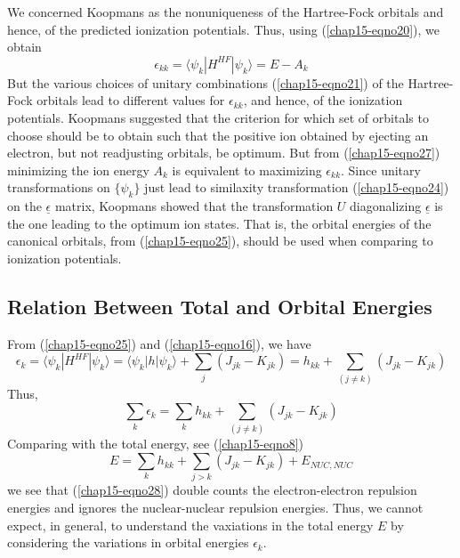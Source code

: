 We concerned Koopmans as the nonuniqueness of the Hartree-Fock
orbitals and hence, of the predicted ionization potentials. Thus,
using (\ref{chap15-eqno20}), we obtain
\begin{equation}
\epsilon_{kk} = \langle \psi_k \left| H^{HF} \right| \psi_k \rangle = E - 
A_k
\label{chap15-eqno27}
\end{equation}
But the various choices of unitary combinations (\ref{chap15-eqno21})
of the Hartree-Fock orbitals lead to different values for
$\epsilon_{kk}$, and hence, of the ionization potentials.  Koopmans
suggested that the criterion for which set of orbitals to choose
should be to obtain such that the positive ion obtained by ejecting an
electron, but not readjusting orbitals, be optimum. But from
(\ref{chap15-eqno27}) minimizing the ion energy $A_k$ is equivalent to
maximizing $\epsilon_{kk}$.  Since unitary transformations on
$\{\psi_k\}$ just lead to similaxity transformation
(\ref{chap15-eqno24}) on the $\underline{\epsilon}$ matrix, Koopmans
showed that the transformation $U$ diagonalizing
$\underline{\epsilon}$ is the one leading to the optimum ion states.
That is, the orbital energies of the canonical orbitals, from
(\ref{chap15-eqno25}), should be used when comparing to ionization
potentials.

\subsection{Relation Between Total and Orbital Energies}

From (\ref{chap15-eqno25}) and (\ref{chap15-eqno16}), we have
\begin{equation}
\epsilon_k = \langle \psi_k \left| H^{HF} \right| \psi_k \rangle = \langle 
\psi_k | h | \psi_k \rangle + \sum_{j} \left( J_{jk} - K_{jk} 
\right) = h_{kk} + \sum_{(j \not= k)} \left( J_{jk} - K_{jk} \right)
\end{equation}
Thus,
\begin{equation}
\sum_{k} \epsilon_k = \sum_{k} h_{kk} + \sum_{(j \not= k)} \left( 
J_{jk} - K_{jk} \right)
\label{chap15-eqno28}
\end{equation}
Comparing with the total energy, see (\ref{chap15-eqno8})
\begin{equation}
E = \sum_{k} h_{kk} + \sum_{j>k} \left( J_{jk} - K_{jk} \right) + 
E_{NUC,NUC}
\end{equation}
we see that (\ref{chap15-eqno28}) double counts the electron-electron
repulsion energies and ignores the nuclear-nuclear repulsion
energies. Thus, we cannot expect, in general, to understand the
vaxiations in the total energy $E$ by considering the variations in
orbital energies $\epsilon_k$.

